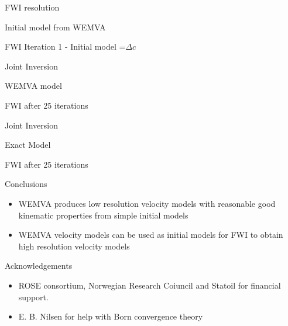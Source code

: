 \documentclass[xcolor=dvipsnames]{beamer}
\begin{document}
\begin{frame}{FWI resolution}

{Initial model from WEMVA}\\


{FWI Iteration 1 - Initial model =$\Delta c$ }\\


\end{frame}
\begin{frame}{Joint Inversion}

{WEMVA model}\\


{FWI after 25 iterations}\\

%
\end{frame}
\begin{frame}{Joint Inversion}

{Exact Model}\\


{FWI after 25 iterations}\\

%
\end{frame}
\begin{frame}{Conclusions}
\begin{itemize}
  \item WEMVA produces low resolution velocity models with
        reasonable good kinematic properties
        from simple initial models 
  \item WEMVA velocity models can be used as initial models for
        FWI to obtain high resolution velocity models
\end{itemize}
%
\end{frame}
\begin{frame}{Acknowledgements}
\begin{itemize}
  \item  ROSE consortium, Norwegian Research Coiuncil and Statoil
         for financial support.
  \item E. B. Nilsen for help with Born convergence theory
\end{itemize}
%
\end{frame}
\end{document}
